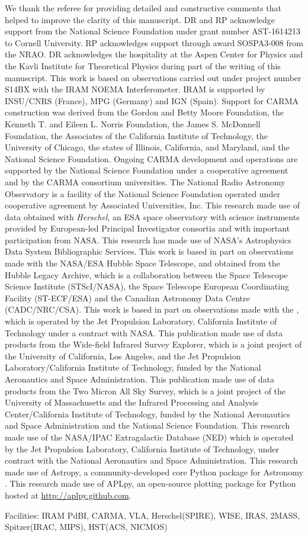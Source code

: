 \documentclass[]{emulateapj}
\begin{document}
\acknowledgments
We thank the referee for providing detailed and constructive comments that helped to improve the clarity of this manuscript.
DR and RP acknowledge support from the National Science Foundation
under grant number AST-1614213 to Cornell University. RP acknowledges
support through award SOSPA3-008 from the NRAO. DR acknowledges the
hospitality at the Aspen Center for Physics and the Kavli Institute
for Theoretical Physics during part of the writing of this manuscript.
This work is based on observations carried out under project number S14BX
with the IRAM NOEMA Interferometer. IRAM is supported by INSU/CNRS (France), MPG (Germany) and IGN (Spain).
Support for CARMA construction was derived from the Gordon and Betty Moore
Foundation, the Kenneth T. and Eileen L. Norris Foundation, the James S.
McDonnell Foundation, the Associates of the California Institute of
Technology, the University of Chicago, the states of Illinois, California, and
Maryland, and the National Science Foundation. Ongoing CARMA development and
operations are supported by the National Science Foundation under a
cooperative agreement and by the CARMA consortium universities.
The National Radio Astronomy Observatory is a facility of the National Science
Foundation operated under cooperative agreement by Associated
Universities, Inc.
This research made use of data obtained with {\it Herschel}, an ESA space
observatory with science instruments provided by European-led Principal
Investigator consortia and with important participation from NASA.
This research has made use of NASA's Astrophysics Data System Bibliographic
Services.
This work is based in part on observations
made with the NASA/ESA Hubble Space Telescope, and obtained from the Hubble
Legacy Archive, which is a collaboration between the Space Telescope Science
Institute (STScI/NASA), the Space Telescope European Coordinating Facility
(ST-ECF/ESA) and the Canadian Astronomy Data Centre (CADC/NRC/CSA).
This work is based
in part on observations made with the \spitzer,
which is operated by the Jet Propulsion Laboratory, California Institute of
Technology under a contract with NASA.
This publication made use of data products from the Wide-field Infrared
Survey Explorer, which is a joint project of the University of California, Los
Angeles, and the Jet Propulsion Laboratory/California Institute of Technology,
funded by the National Aeronautics and Space Administration.
This publication made use of data products from the Two Micron All Sky
Survey, which is a joint project of the University of Massachusetts and the
Infrared Processing and Analysis Center/California Institute of Technology,
funded by the National Aeronautics and Space Administration and the National
Science Foundation.
This research made use of the NASA/IPAC Extragalactic Database (NED) which
is operated by the Jet Propulsion Laboratory, California Institute of
Technology, under contract with the National Aeronautics and Space
Administration.
This research made use of Astropy, a community-developed core Python package for Astronomy \citep{astropy}.
This research made use of APLpy, an open-source plotting package for Python hosted at \url{http://aplpy.github.com}.

Facilities: IRAM PdBI, CARMA, VLA, Herschel(SPIRE), WISE, IRAS, 2MASS, Spitzer(IRAC, MIPS), HST(ACS, NICMOS)






\end{document}
